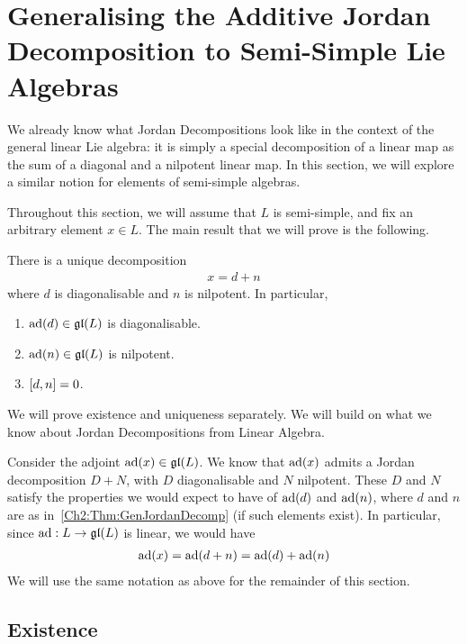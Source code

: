 \section{Generalising the Additive Jordan Decomposition to Semi-Simple Lie Algebras}

We already know what Jordan Decompositions look like in the context of the general linear Lie algebra: it is simply a special decomposition of a linear map as the sum of a diagonal and a nilpotent linear map. In this section, we will explore a similar notion for elements of semi-simple algebras.

Throughout this section, we will assume that $L$ is semi-simple, and fix an arbitrary element $x \in L$. The main result that we will prove is the following.

\begin{boxtheorem}
    There is a unique decomposition
    \begin{align}
        x = d + n
        \label{Ch2:Thm:GenJordanDecomp}
    \end{align}
    where $d$ is diagonalisable and $n$ is nilpotent. In particular,
    \begin{enumerate}[label = \normalfont \arabic*., noitemsep]
        \item $\operatorname{ad}\!\left( d \right) \in \mathfrak{gl}\!\left( L \right)$ is diagonalisable.
        \item $\operatorname{ad}\!\left( n \right) \in \mathfrak{gl}\!\left( L \right)$ is nilpotent.
        \item $\left[ d, n \right] = 0$.
    \end{enumerate}
\end{boxtheorem}

We will prove existence and uniqueness separately. We will build on what we know about Jordan Decompositions from Linear Algebra.

Consider the adjoint $\operatorname{ad}\!\left( x \right) \in \mathfrak{gl}\!\left( L \right)$. We know that $\operatorname{ad}\!\left( x \right)$ admits a Jordan decomposition $D + N$, with $D$ diagonalisable and $N$ nilpotent. These $D$ and $N$ satisfy the properties we would expect to have of $\operatorname{ad}\!\left( d \right)$ and $\operatorname{ad}\!\left( n \right)$, where $d$ and $n$ are as in~\eqref{Ch2:Thm:GenJordanDecomp} (if such elements exist). In particular, since $\operatorname{ad} : L \to \mathfrak{gl}\!\left( L \right)$ is linear, we would have
\begin{align*}
    \operatorname{ad}\!\left( x \right) = \operatorname{ad}\!\left( d + n \right) = \operatorname{ad}\!\left( d \right) + \operatorname{ad}\!\left( n \right)
\end{align*}
We will use the same notation as above for the remainder of this section.

\subsection{Existence}

